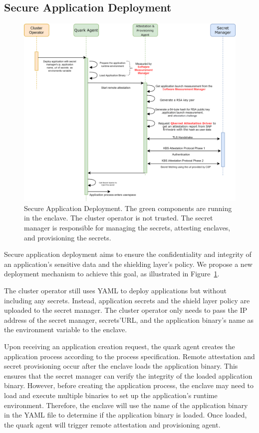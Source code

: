 \subsection{Secure Application Deployment}
\label{sec:secure_application_deployment}
\begin{figure}[!htb]
    \centering
    \includegraphics[height=0.5\textheight]{images/attestation_provisioning.png}
    \caption[Secure Application Deployment Workflow]{Secure Application Deployment. The green components are running in the enclave. The cluster operator is not trusted. The secret manager is responsible for managing the secrets, attesting enclaves, and provisioning the secrets.}
    \label{fig:attestation_provisioning}
\end{figure}

Secure application deployment aims to ensure the confidentiality and integrity of an application's sensitive data and the shielding layer's policy. We propose a new deployment mechanism to achieve this goal, as illustrated in Figure~\ref{fig:attestation_provisioning}.
 
The cluster operator still uses YAML to deploy applications but without including any secrets. Instead, application secrets and the shield layer policy are uploaded to the secret manager. The cluster operator only needs to pass the IP address of the secret manager, secrets'URL, and the application binary's name as the environment variable to the 
enclave.

Upon receiving an application creation request, the quark agent creates the application process according to the process specification. Remote attestation and secret provisioning occur after the enclave loads the application binary. This ensures that the secret manager can verify the integrity of the loaded application binary. However, before creating the 
application process, the enclave may need to load and execute multiple binaries to set up the application's runtime environment. Therefore, the enclave will use the name of the application binary in the YAML file to determine if the application binary is loaded. Once loaded, the quark agent will trigger remote attestation and provisioning agent.
 
